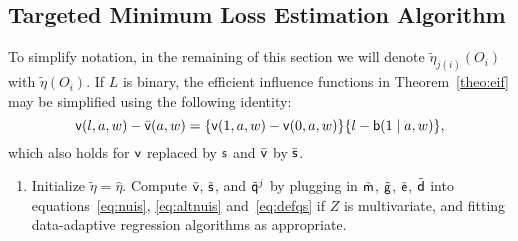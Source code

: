 \subsection{Targeted Minimum Loss Estimation Algorithm}

To simplify notation, in the remaining of this section we will denote
$\tilde \eta_{j(i)}(O_i)$ with $\tilde \eta(O_i)$. If $L$ is binary,
the efficient influence functions in Theorem~\ref{theo:eif} may be
simplified using the following identity:
\[ \mathsf{v}(l,a,w) - \bar{\mathsf{v}}(a,w) = \{\mathsf{v}(1,a,w) -\mathsf{v}(0,a,w)\}
\{l-\mathsf{b}(1\mid a, w)\},\] which also holds for $\mathsf{v}$ replaced by $\mathsf{s}$ and
$\bar{\mathsf{v}}$ by $\bar{\mathsf{s}}$.

\begin{enumerate}[label=Step \arabic*., align=left, leftmargin=*]
\item Initialize $\tilde\eta =\hat\eta$. Compute $\tilde{\mathsf{v}}$,
  $\tilde{\mathsf{s}}$, and $\tilde{\mathsf{q}}^j$ by plugging in $\tilde {\mathsf{m}}$,
  $\tilde {\mathsf{g}}$, $\tilde {\mathsf{e}}$, $\tilde {\mathsf{d}}$ into equations~\eqref{eq:nuis},
  \eqref{eq:altnuis} and~\eqref{eq:defqs} if
  $Z$ is multivariate, and fitting data-adaptive regression algorithms as
  appropriate.


\end{enumerate}
